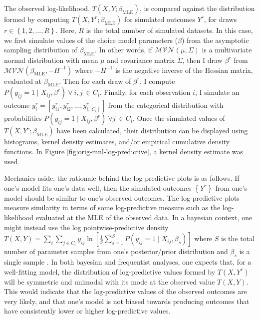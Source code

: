 \documentclass[preprint]{elsarticle}
\begin{document}
The observed log-likelihood, $T \left( X, Y; \beta _{\textrm{MLE}} \right)$, is compared against the distribution formed by computing $T \left( X, Y^r; \beta _{\textrm{MLE}} \right)$ for simulated outcomes $Y^r$, for draws $r \in \left\lbrace 1, 2, ..., R \right\rbrace$. Here, $R$ is the total number of simulated datasets. In this case, we first simulate values of the choice model parameters ($\beta$) from the asymptotic sampling distribution of $\beta _{\textrm{MLE}}$. In other words, if $\mathcal{MVN} \left( \mu, \Sigma \right)$ is a multivariate normal distribution with mean $\mu$ and covariance matrix $\Sigma$, then I draw $\beta ^r$ from $\mathcal{MVN} \left(  \beta _{\textrm{MLE}}, -H^{-1} \right)$ where $-H^{-1}$ is the negative inverse of the Hessian matrix, evaluated at $\beta _{\textrm{MLE}}$. Then for each draw of $\beta ^r$, I compute $P \left( y_{ij} = 1 \mid X_{ij}, \beta ^r \right) \ \forall \  i, j \ \in C_i$. Finally, for each observation $i$, I simulate an outcome $y ^r_i = \left[ y ^r _{i1}, y ^r _{i2}, ..., y ^r _{i, \mid C_i \mid} \right]$ from the categorical distribution with probabilities $P \left( y_{ij} = 1 \mid X_{ij}, \beta ^r \right) \  \forall j \ \in C_i$. Once the simulated values of $T \left( X, Y^r; \beta _{\textrm{MLE}} \right)$ have been calculated, their distribution can be displayed using histograms, kernel density estimates, and/or empirical cumulative density functions. In Figure \ref{fig:orig-mnl-log-predictive}, a kernel density estimate was used.

Mechanics aside, the rationale behind the log-predictive plots is as follows. If one's model fits one's data well, then the simulated outcomes $\left\lbrace Y^r \right\rbrace$ from one's model should be similar to one's observed outcomes. The log-predictive plots measure similarity in terms of some log-predictive measure such as the log-likelihood evaluated at the MLE of the observed data. In a bayesian context, one might instead use the log pointwise-predictive density $T \left( X, Y \right) = \sum _i \sum _{j \in C_i} y_{ij} \ln \left[ \frac{1}{S }\sum _{s=1} ^S P \left( y_{ij} = 1 \mid X_{ij}, \beta _s \right) \right]$ where $S$ is the total number of parameter samples from one's posterior/prior distribution and $\beta _s$ is a single sample \citep[p.169]{gelman_bayesian_2014}. In both bayesian and frequentist analyses, one expects that, for a well-fitting model, the distribution of log-predictive values formed by $T \left( X, Y^r \right)$ will be symmetric and unimodal with its mode at the observed value $T \left( X, Y \right)$. This would indicate that the log-predictive values of the observed outcomes are very likely, and that one's model is not biased towards producing outcomes that have consistently lower or higher log-predictive values.
\end{document}
